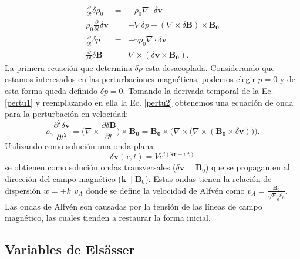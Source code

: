 \documentclass[a4paper,11pt]{report}
\begin{document}
\begin{eqnarray}
  \frac{\partial}{\partial t} \delta \rho_0 &=& - \rho_0 \nabla \cdot \delta \boldsymbol{v}\\
  \rho_0 \frac{\partial}{\partial t} \delta \boldsymbol{v} &=& -\nabla \delta p + (\nabla \times \delta \boldsymbol{B})\times \boldsymbol{B_0} \label{pertu1}\\
  \frac{\partial}{\partial t} \delta p &=& -\gamma p_0 \nabla \cdot \delta \boldsymbol{v}\\
  \frac{\partial}{\partial t} \delta \boldsymbol{B} &=& \nabla \times (\delta \boldsymbol{v}\times \boldsymbol{B_0}) \label{pertu2}.  
\end{eqnarray}
La primera ecuación que determina $\delta \rho$ esta desacoplada. Considerando que estamos interesados en las perturbaciones magnéticas, podemos elegir $p=0$ y de esta forma queda definido $\delta p=0$. Tomando la derivada temporal de la Ec. \ref{pertu1} y reemplazando en ella la Ec. \ref{pertu2} obtenemos una ecuación de onda para la perturbación en velocidad:
\begin{equation}
  \rho_0 \frac{\partial^2 \delta \boldsymbol{v}}{\partial t^2}=\Bigg(\nabla \times \frac{\partial \delta \boldsymbol{B}}{\partial t} \Bigg) \times \boldsymbol{B_0}= \boldsymbol{B_0} \times \Bigg( \nabla \times \Bigg( \nabla \times (\boldsymbol{B_0}\times \delta \boldsymbol{v}) \Bigg) \Bigg).
\end{equation}
Utilizando como solución una onda plana
\begin{equation}
  \delta \boldsymbol{v}(\boldsymbol{r},t)=V e^{i(\boldsymbol{k}\boldsymbol{r}-wt)}
\end{equation}
se obtienen como solución ondas transversales ($\delta\boldsymbol{v}\perp \boldsymbol{B}_0$) que se propagan en al dirección del campo magnético ($\boldsymbol{k} \parallel \boldsymbol{B}_0$). Estas ondas tienen la relación de dispersión $w=\pm k_{\parallel} v_A$  donde se define la velocidad de Alfvén como  $v_A=\frac{\boldsymbol{B}_0}{\sqrt \mu_0 \rho_0}$. Las ondas de Alfvén son causadas por la tensión de las líneas de campo magnético, las cuales tienden a restaurar la forma inicial.


\subsection{Variables de Elsässer}
\end{document}
